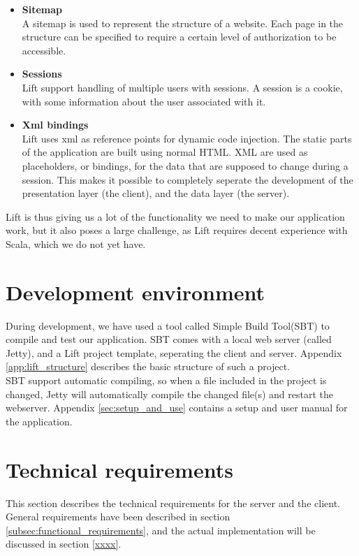 \begin{itemize}
	\item \textbf{Sitemap}\\
	A sitemap is used to represent the structure of a website. Each page in the structure can be specified to require a certain level of authorization to be accessible. \\
	\item \textbf{Sessions}\\
	Lift support handling of multiple users with sessions. A session is a cookie, with some information about the user associated with it.\\
	\item \textbf{Xml bindings}\\
	Lift uses xml as reference points for dynamic code injection. The static parts of the application are built using normal HTML. XML are used as placeholders, or bindings, for the data that are supposed to change during a session. This makes it possible to completely seperate the development of the presentation layer (the client), and the data layer (the server).
\end{itemize}

Lift is thus giving us a lot of the functionality we need to make our application work, but it also poses a large challenge, as Lift requires decent experience with Scala, which we do not yet have.

\section{Development environment}
\label{sec:development_environment}
During development, we have used a tool called Simple Build Tool(SBT)\cite{sbt} to compile and test our application. SBT comes with a local web server (called Jetty), and a Lift project template, seperating the client and server. Appendix \ref{app:lift_structure} describes the basic structure of such a project.\\
SBT support automatic compiling, so when a file included in the project is changed, Jetty will automatically compile the changed file(s) and restart the webserver. Appendix \ref{sec:setup_and_use} contains a setup and user manual for the application.

\section{Technical requirements}
\label{sec:tech_req}
This section describes the technical requirements for the server and the client. General requirements have been described in section \ref{subsec:functional_requirements}, and the actual implementation will be discussed in section \ref{xxxx}.


